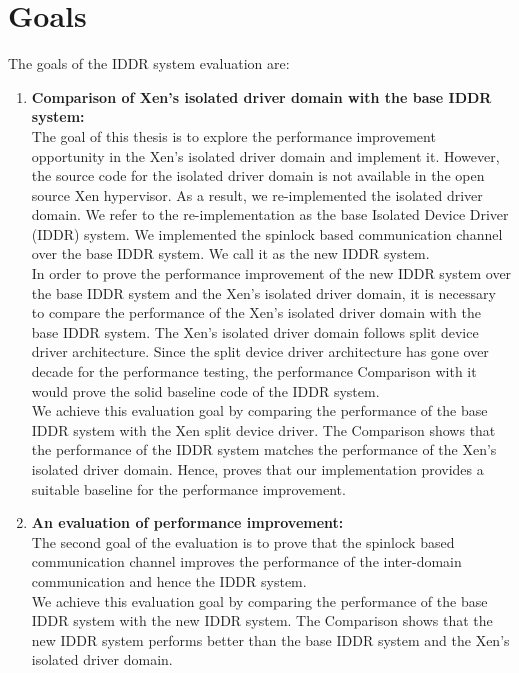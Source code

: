 \section{Goals}
\label{sec:goals}
The goals of the IDDR system evaluation are:
\begin{enumerate}
\item \textbf{Comparison  of Xen's isolated driver domain with the base IDDR system:}
\\[3mm]
The goal of this thesis is to explore the performance improvement opportunity in the Xen's isolated driver domain and implement it. However, the source code for the isolated driver domain is not available in the open source Xen hypervisor. As a result, we re-implemented the isolated driver domain. We refer to the re-implementation as the base Isolated Device Driver (IDDR) system. We implemented the spinlock based communication channel over the base IDDR system. We call it as the new IDDR system.
\\[3mm]
In order to prove the performance improvement of the new IDDR system over the base IDDR system and the Xen's isolated driver domain, it is necessary to compare the performance of the Xen's isolated driver domain with the base IDDR system. The Xen's isolated driver domain follows split device driver architecture. Since the split device driver architecture has gone over decade for the performance testing, the performance Comparison with it would prove the solid baseline code of the IDDR system. 
\\[3mm]
We achieve this evaluation goal by comparing the performance of the base IDDR system with the Xen split device driver. The Comparison  shows that the performance of the IDDR system matches the performance of the Xen's isolated driver domain. Hence, proves that our implementation provides a suitable baseline for the performance improvement.

\item \textbf{An evaluation of performance improvement:}
\\[3mm] 
The second goal of the evaluation is to prove that the spinlock based communication channel improves the performance of the inter-domain communication and hence the IDDR system.
\\[3mm]
We achieve this evaluation goal by comparing the performance of the base IDDR system with the new IDDR system. The Comparison  shows that the new IDDR system performs better than the base IDDR system and the Xen's isolated driver domain.
\end{enumerate}

